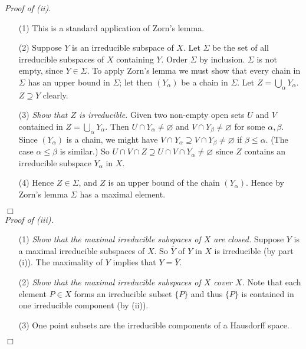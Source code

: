 \documentclass{article}
\begin{document}
\emph{Proof of (ii).}
\begin{enumerate}
\item[(1)]
  This is a standard application of Zorn's lemma.

\item[(2)]
  Suppose $Y$ is an irreducible subspace of $X$.
  Let $\Sigma$ be the set of all irreducible subspaces of $X$ containing $Y$.
  Order $\Sigma$ by inclusion.
  $\Sigma$ is not empty, since $Y \in \Sigma$.
  To apply Zorn's lemma we must show that every chain in $\Sigma$ has an upper bound in $\Sigma$;
  let then $(Y_\alpha)$ be a chain in $\Sigma$.
  Let $Z = \bigcup_{\alpha} Y_\alpha$.
  $Z \supseteq Y$ clearly.

\item[(3)]
  \emph{Show that $Z$ is irreducible.}
  Given two non-empty open sets $U$ and $V$ contained in $Z = \bigcup_{\alpha} Y_\alpha$.
  Then $U \cap Y_\alpha \neq \varnothing$ and $V \cap Y_\beta \neq \varnothing$ for some $\alpha, \beta$.
  Since $(Y_\alpha)$ is a chain, we might have
  $V \cap Y_\alpha \supseteq V \cap Y_\beta \neq \varnothing$ if $\beta \leq \alpha$.
  (The case $\alpha \leq \beta$ is similar.)
  So $U \cap V \cap Z \supseteq U \cap V \cap Y_\alpha \neq \varnothing$
  since $Z$ contains an irreducible subspace $Y_\alpha$ in $X$.

\item[(4)]
  Hence $Z \in \Sigma$, and $Z$ is an upper bound of the chain $(Y_\alpha)$.
  Hence by Zorn's lemma $\Sigma$ has a maximal element.
\end{enumerate}
$\Box$ \\



\emph{Proof of (iii).}
\begin{enumerate}
\item[(1)]
  \emph{Show that the maximal irreducible subspaces of $X$ are closed.}
  Suppose $Y$ is a maximal irreducible subspaces of $X$.
  So $\overline{Y}$ of $Y$ in $X$ is irreducible (by part (i)).
  The maximality of $Y$ implies that $Y = \overline{Y}$.

\item[(2)]
  \emph{Show that the maximal irreducible subspaces of $X$ cover $X$.}
  Note that each element $P \in X$ forms an irreducible subset $\{P\}$ and thus
  $\{P\}$ is contained in one irreducible component (by (ii)).

\item[(3)]
  One point subsets are the irreducible components of a Hausdorff space.
\end{enumerate}
$\Box$ \\
\end{document}
